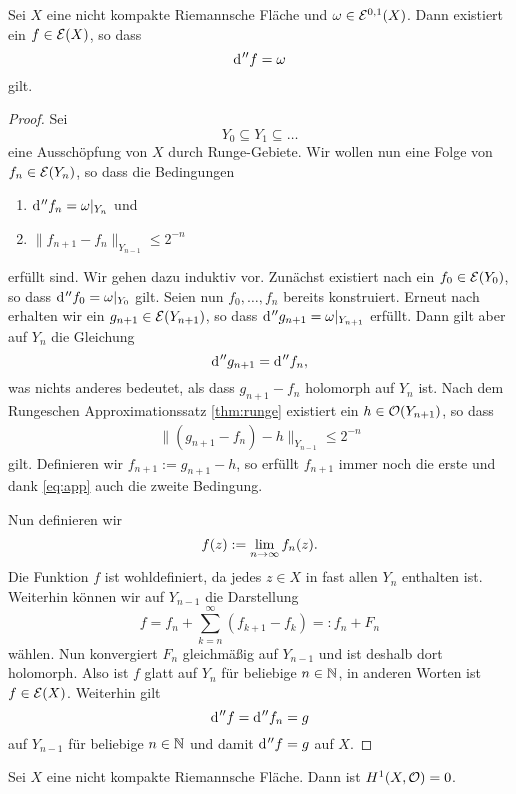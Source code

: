 \begin{thm}
  \label{thm:h-hol}
  Sei $X$ eine nicht kompakte Riemannsche Fläche und $\omega \in
  \mathcal{E}^{0,1}(X)$. Dann existiert ein $f \in \mathcal{E}(X)$, so dass
  \[
  \d[''f] = \omega
  \]
  gilt.
\end{thm}

\begin{proof}
  Sei
  \[
  Y_0 \subseteq Y_1 \subseteq \dots
  \]
  eine Ausschöpfung von $X$ durch Runge-Gebiete. Wir wollen nun eine
  Folge von $f_n \in \mathcal{E}(Y_n)$, so dass die Bedingungen
  \begin{enumerate}
  \item $\d[''f_n] = \omega|_{Y_n}$ und
  \item $\|f_{n+1} - f_n \|_{Y_{n-1}} \leq 2^{-n}$
  \end{enumerate}
  erfüllt sind. Wir gehen dazu induktiv vor. Zunächst existiert nach
  \cite[Kor. 14.16]{For} ein $f_0 \in \mathcal{E}(Y_0)$, so dass $\d[''f_0]
  = \omega|_{Y_0}$ gilt. Seien nun $f_0, \dots, f_n$ bereits
  konstruiert. Erneut nach \cite[Kor. 14.16]{For} erhalten wir ein
  $g_{n+1} \in \mathcal{E}(Y_{n+1})$, so dass $\d[''g_{n+1}] =
  \omega|_{Y_{n+1}}$ erfüllt. Dann gilt aber auf $Y_n$ die Gleichung
  \[
  \d['' g_{n+1}] = \d['' f_n],
  \]
  was nichts anderes bedeutet, als dass $g_{n+1} - f_n$ holomorph auf
  $Y_n$ ist. Nach dem Rungeschen Approximationssatz \ref{thm:runge}
  existiert ein $h \in \mathcal{O}(Y_{n+1})$, so dass
  \begin{align}
  \|(g_{n+1} - f_n) - h\|_{Y_{n-1}} \leq 2^{-n} \label{eq:app}
  \end{align}
  gilt. Definieren wir $f_{n+1} := g_{n+1} - h$, so erfüllt $f_{n+1}$
  immer noch die erste und dank \eqref{eq:app} auch die zweite
  Bedingung.

  Nun definieren wir
  \[
  f(z) := \lim_{n \rightarrow \infty} f_n(z).
  \]
  Die Funktion $f$ ist wohldefiniert, da jedes $z \in X$ in fast allen
  $Y_n$ enthalten ist. Weiterhin können wir auf $Y_{n-1}$ die Darstellung
  \[
  f = f_n + \sum_{k=n}^\infty (f_{k+1} - f_k) =: f_n + F_n
  \]
  wählen. Nun konvergiert $F_n$ gleichmäßig auf $Y_{n-1}$ und ist deshalb
  dort holomorph. Also ist $f$ glatt auf $Y_n$ für beliebige $n \in
  \mathbb{N}$, in anderen Worten ist $f \in \mathcal{E}(X)$. Weiterhin gilt
  \[
  \d[''f] = \d['' f_n] = g
  \]
  auf $Y_{n-1}$ für beliebige $n \in \mathbb{N}$ und damit $\d[''f] = g$ auf $X$.
\end{proof}

\begin{cor}
  \label{cor:h-hol}
  Sei $X$ eine nicht kompakte Riemannsche Fläche. Dann ist $H^1(X,
  \mathcal{O}) = 0$.
\end{cor}

